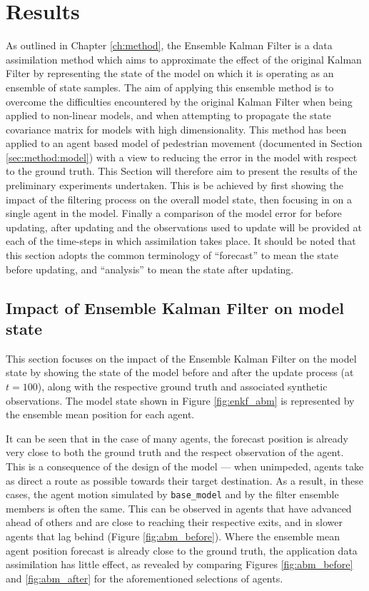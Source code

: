 \chapter{Results}\label{ch:results}

As outlined in Chapter \ref{ch:method}, the Ensemble Kalman Filter is a data
assimilation method which aims to approximate the effect of the original Kalman
Filter by representing the state of the model on which it is operating as an
ensemble of state samples.
The aim of applying this ensemble method is to overcome the difficulties
encountered by the original Kalman Filter when being applied to non-linear
models, and when attempting to propagate the state covariance matrix for models
with high dimensionality.
This method has been applied to an agent based model of pedestrian movement
(documented in Section \ref{sec:method:model}) with a view to reducing the error
in the model with respect to the ground truth.
This Section will therefore aim to present the results of the preliminary
experiments undertaken.
This is be achieved by first showing the impact of the filtering process on the
overall model state, then focusing in on a single agent in the model.
Finally a comparison of the model error for before updating, after updating and
the observations used to update will be provided at each of the time-steps in
which assimilation takes place.
It should be noted that this section adopts the common terminology of
``forecast'' to mean the state before updating, and ``analysis'' to mean the
state after updating.

\section{Impact of Ensemble Kalman Filter on model
state}\label{sec:results:model}

This section focuses on the impact of the Ensemble Kalman Filter on the model
state by showing the state of the model before and after the update process (at
$t=100$), along with the respective ground truth and associated synthetic
observations.
The model state shown in Figure \ref{fig:enkf_abm} is represented by the
ensemble mean position for each agent.

It can be seen that in the case of many agents, the forecast position is already
very close to both the ground truth and the respect observation of the agent.
This is a consequence of the design of the model --- when unimpeded, agents take
as direct a route as possible towards their target destination.
As a result, in these cases, the agent motion simulated by \texttt{base\_model}
and by the filter ensemble members is often the same.
This can be observed in agents that have advanced ahead of others and are close
to reaching their respective exits, and in slower agents that lag behind (Figure
\ref{fig:abm_before}).
Where the ensemble mean agent position forecast is already close to the ground
truth, the application data assimilation has little effect, as revealed by
comparing Figures \ref{fig:abm_before} and \ref{fig:abm_after} for the
aforementioned selections of agents.

